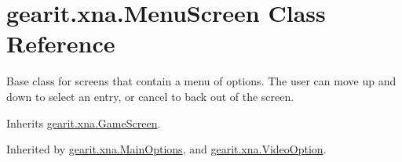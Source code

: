 \hypertarget{classgearit_1_1xna_1_1_menu_screen}{\section{gearit.\+xna.\+Menu\+Screen Class Reference}
\label{classgearit_1_1xna_1_1_menu_screen}
}


Base class for screens that contain a menu of options. The user can move up and down to select an entry, or cancel to back out of the screen.  




Inherits \hyperlink{classgearit_1_1xna_1_1_game_screen}{gearit.\+xna.\+Game\+Screen}.



Inherited by \hyperlink{classgearit_1_1xna_1_1_main_options}{gearit.\+xna.\+Main\+Options}, and \hyperlink{classgearit_1_1xna_1_1_video_option}{gearit.\+xna.\+Video\+Option}.

